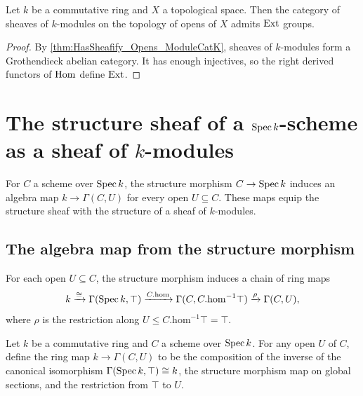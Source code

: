 \begin{theorem}\leanok
  \label{thm:HasExt_Sheaf_Opens_ModuleCatK}

  Let \(k\) be a commutative ring and \(X\) a topological space. Then the category of sheaves of \(k\)-modules on the topology of opens of \(X\) admits \(\operatorname{Ext}\) groups.
\end{theorem}

\begin{proof}


\leanok
  By \cref{thm:HasSheafify_Opens_ModuleCatK}, sheaves of \(k\)-modules form a Grothendieck abelian category. It has enough injectives, so the right derived functors of \(\operatorname{Hom}\) define \(\operatorname{Ext}\).
\end{proof}

\section{The structure sheaf of a \(\operatorname{Spec} k\)-scheme as a sheaf of \(k\)-modules}
\label{sec:scheme_toModuleKSheaf}

For \(C\) a scheme over \(\operatorname{Spec} k\), the structure morphism \(C \to \operatorname{Spec} k\) induces an algebra map \(k \to \Gamma(C, U)\) for every open \(U \subseteq C\). These maps equip the structure sheaf with the structure of a sheaf of \(k\)-modules.

\subsection{The algebra map from the structure morphism}

For each open \(U \subseteq C\), the structure morphism induces a chain of ring maps
\[
  k \xrightarrow{\cong} \Gamma(\operatorname{Spec} k, \top) \xrightarrow{C.\mathrm{hom}} \Gamma(C, C.\mathrm{hom}^{-1}\top) \xrightarrow{\rho} \Gamma(C, U),
\]
where \(\rho\) is the restriction along \(U \le C.\mathrm{hom}^{-1}\top = \top\).

\begin{definition}\leanok
  \label{def:Scheme_kToSection}
  
  Let \(k\) be a commutative ring and \(C\) a scheme over \(\operatorname{Spec} k\). For any open \(U\) of \(C\), define the ring map \(k \to \Gamma(C, U)\) to be the composition of the inverse of the canonical isomorphism \(\Gamma(\operatorname{Spec} k, \top) \cong k\), the structure morphism map on global sections, and the restriction from \(\top\) to \(U\).
\end{definition}

